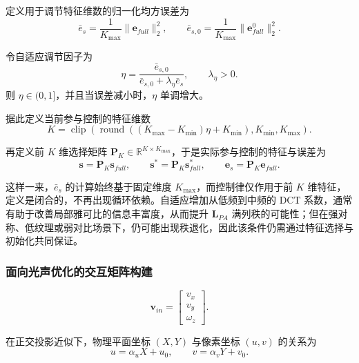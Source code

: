 \documentclass{article}
\begin{document}
定义用于调节特征维数的归一化均方误差为
\begin{equation}
\bar{e}_s = \frac{1}{K_{\max}}\|\mathbf{e}_{full}\|_2^2, \qquad
\bar{e}_{s,0} = \frac{1}{K_{\max}}\|\mathbf{e}^{0}_{full}\|_2^2 .
\end{equation}

令自适应调节因子为
\begin{equation}
\eta = \frac{\bar{e}_{s,0}}{\bar{e}_{s,0} + \lambda_{\eta}\bar{e}_s}, \qquad \lambda_{\eta} > 0 .
\end{equation}
则 $\eta \in (0,1]$，并且当误差减小时，$\eta$ 单调增大。

据此定义当前参与控制的特征维数
\begin{equation}
K = \operatorname{clip}\!\left(
\operatorname{round}\!\left((K_{\max} - K_{\min})\eta + K_{\min}\right),
K_{\min},
K_{\max}
\right).
\end{equation}

再定义前 $K$ 维选择矩阵 $\mathbf{P}_K \in \mathbb{R}^{K \times K_{\max}}$，于是实际参与控制的特征与误差为
\begin{equation}
\mathbf{s} = \mathbf{P}_K \mathbf{s}_{full}, \qquad
\mathbf{s}^{*} = \mathbf{P}_K \mathbf{s}^{*}_{full}, \qquad
\mathbf{e}_s = \mathbf{P}_K \mathbf{e}_{full} .
\end{equation}

这样一来，$\bar{e}_s$ 的计算始终基于固定维度 $K_{\max}$，而控制律仅作用于前 $K$ 维特征，定义是闭合的，不再出现循环依赖。自适应增加从低频到中频的 DCT 系数，通常有助于改善局部雅可比的信息丰富度，从而提升 $\mathbf{L}_{PA}$ 满列秩的可能性；但在强对称、低纹理或弱对比场景下，仍可能出现秩退化，因此该条件仍需通过特征选择与初始化共同保证。
\subsubsection{面向光声优化的交互矩阵构建}
\label{sec:PA-Optimized_Interaction_Matrix}
\begin{equation}
\mathbf{v}_{in} =
\begin{bmatrix}
v_x \\ v_y \\ \omega_z
\end{bmatrix}.
\end{equation}

在正交投影近似下，物理平面坐标 $(X,Y)$ 与像素坐标 $(u,v)$ 的关系为
\begin{equation}
u = \alpha_u X + u_0, \qquad
v = \alpha_v Y + v_0 .
\end{equation}
\end{document}
